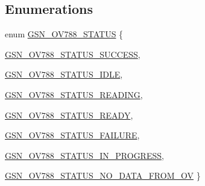 \subsection*{Enumerations}
\begin{DoxyCompactItemize}
\item 
enum \hyperlink{a00537_a7c0cb78d762a84b48d1857dafbad0455}{GSN\_\-OV788\_\-STATUS} \{ \par
\hyperlink{a00537_a7c0cb78d762a84b48d1857dafbad0455a41409673eef3a45043bfeee889ebefff}{GSN\_\-OV788\_\-STATUS\_\-SUCCESS}, 
\par
\hyperlink{a00537_a7c0cb78d762a84b48d1857dafbad0455a85bb9218f89c2659ff04e8e453208d12}{GSN\_\-OV788\_\-STATUS\_\-IDLE}, 
\par
\hyperlink{a00537_a7c0cb78d762a84b48d1857dafbad0455aacc5f2733d3cebac06e368266c808cac}{GSN\_\-OV788\_\-STATUS\_\-READING}, 
\par
\hyperlink{a00537_a7c0cb78d762a84b48d1857dafbad0455a9afdf5dd0d48ac17d784d73f6ec895ad}{GSN\_\-OV788\_\-STATUS\_\-READY}, 
\par
\hyperlink{a00537_a7c0cb78d762a84b48d1857dafbad0455a3c97fa155eef8dc021b25e0162a0e1d5}{GSN\_\-OV788\_\-STATUS\_\-FAILURE}, 
\par
\hyperlink{a00537_a7c0cb78d762a84b48d1857dafbad0455aa95c918200098527f1a5c81a054048bf}{GSN\_\-OV788\_\-STATUS\_\-IN\_\-PROGRESS}, 
\par
\hyperlink{a00537_a7c0cb78d762a84b48d1857dafbad0455a847604ad060345a1a1fa19296f75275e}{GSN\_\-OV788\_\-STATUS\_\-NO\_\-DATA\_\-FROM\_\-OV}
 \}
\end{DoxyCompactItemize}
